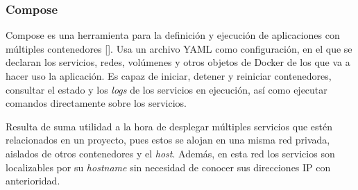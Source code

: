 \subsubsection{Compose}

Compose es una herramienta para la definición y ejecución de aplicaciones con múltiples contenedores [\cite{docker-compose}]. Usa un archivo YAML como configuración, en el que se declaran los servicios, redes, volúmenes y otros objetos de Docker de los que va a hacer uso la aplicación. Es capaz de iniciar, detener y reiniciar contenedores, consultar el estado y los \textit{logs} de los servicios en ejecución, así como ejecutar comandos directamente sobre los servicios.      

Resulta de suma utilidad a la hora de desplegar múltiples servicios que estén relacionados en un proyecto, pues estos se alojan en una misma red privada, aislados de otros contenedores y el \textit{host}. Además, en esta red los servicios son localizables por su \textit{hostname} sin necesidad de conocer sus direcciones IP con anterioridad.

